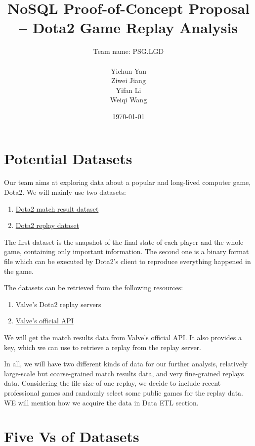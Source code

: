 \documentclass{article}
\title{NoSQL Proof-of-Concept Proposal -- Dota2 Game Replay Analysis}
\author{
	Team name: PSG.LGD \\ \\
	Yichun Yan \\
	Ziwei Jiang \\
	Yifan Li \\
	Weiqi Wang
}
\date{\today}
\begin{document}
\maketitle

\tableofcontents
\clearpage


\section{Potential Datasets}

Our team aims at exploring data about a popular and long-lived computer game, Dota2.
We will mainly use two datasets:

\begin{enumerate}
\item \href{https://wiki.teamfortress.com/wiki/WebAPI/GetMatchDetails}{Dota2 match result dataset}
\item \href{https://wiki.teamfortress.com/wiki/Replay}{Dota2 replay dataset}
\end{enumerate}

The first dataset is the snapshot of the final state of each player and the whole game, containing only important information.
The second one is a binary format file which can be executed by Dota2's client to reproduce everything happened in the game.

The datasets can be retrieved from the following resources:

\begin{enumerate}
\item Valve's Dota2 replay servers
\item \href{https://wiki.teamfortress.com/wiki/WebAPI}{Valve's official API}
\end{enumerate}

We will get the match results data from Valve's official API.
It also provides a key, which we can use to retrieve a replay from the replay server.

In all, we will have two different kinds of data for our further analysis, relatively large-scale but coarse-grained match results data, and very fine-grained replays data.
Considering the file size of one replay, we decide to include recent professional games and randomly select some public games for the replay data.
WE will mention how we acquire the data in Data ETL section.

\section{Five Vs of Datasets}
\end{document}

